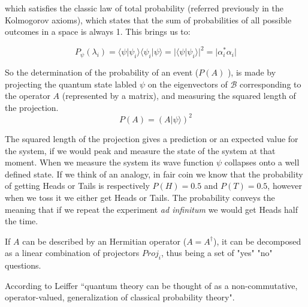 which satisfies the classic law of total probability (referred previously in the Kolmogorov axioms), which states that the sum of probabilities of all possible outcomes in a space is always 1. This brings us to: 

\begin{equation}
\label{eq_born_rule_2}
P_{\psi}(\lambda_{i}) =\langle \psi \vert\psi_{i}\rangle\langle\psi_{i}\vert \psi \rangle=\vert\langle \psi \vert\psi_{i}\rangle \vert^{2} = \vert \alpha_{i}^{*}\alpha_{i}\vert
\end{equation}

So the determination of the probability of an event ($P(A)$ ),
is made by projecting the quantum state labled $\psi$ on the eigenvectors of $\mathcal{B}$ corresponding to the operator $A$ (represented by a matrix), and measuring the squared length of the projection.\cite{Trueblood}
\begin{equation}
P(A)=\left(A\vert \psi\rangle\right)^{2}
\end{equation}

The squared length of the projection gives a prediction or an expected value for the system, if we would peak and measure the state of the system at that moment. When we measure the system its wave function $\psi$ collapses onto a well defined state. If we think of an analogy, in fair coin we know that the probability of getting Heads or Tails is respectively $P(H)=0.5$ and $P(T)=0.5$, however when we toss it we either get Heads or Tails. The probability conveys the meaning that if we repeat the experiment \textit{ad infinitum} we would get Heads half the time. 

If $A$ can be described by an Hermitian operator ($A = A^{\dagger}$), it can be decomposed as a linear combination of projectors $Proj_{i}$, thus being a set of "yes" "no" questions.

According to Leiffer\cite{Leifer2008} ``quantum theory can be thought of as a non-commutative, operator-valued, generalization of classical probability theory". 

